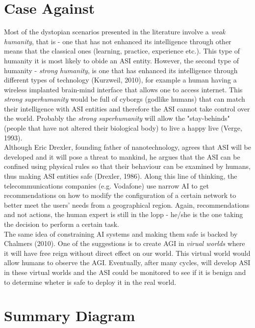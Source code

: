 \documentclass[11pt]{article}
\begin{document}
\section*{Case Against}
	Most of the dystopian scenarios presented in the literature involve a \textit{weak humanity}, that is - one that has not enhanced its intelligence through other means that the classical ones (learning, practice, experience etc.). This type of humanity it is most likely to obide an ASI entity. However, the second type of humanity - \textit{strong humanity}, is one that has enhanced its intelligence through different types of technology (Kurzweil, 2010), for example a human having a wireless implanted brain-mind interface that allows one to access internet. This \textit{strong superhumanity} would be full of cyborgs (godlike humans) that can match their intelligence with ASI entities and therefore the ASI cannot take control over the world. Probably the \textit{strong superhumanity} will allow the  "stay-behinds" (people that have not altered their biological body) to live a happy live (Verge, 1993). \\

	\indent
Although Eric Drexler, founding father of nanotechnology, agrees that ASI will be developed and it will pose a threat to mankind, he argues that the ASI can be confined using physical rules so that their behaviour can be examined by humans, thus making ASI entities safe (Drexler, 1986). Along this line of thinking, the telecommunications companies (e.g. Vodafone) use narrow AI to get recommendations on how to modify the configuration of a certain network to better meet the users' needs from a geographical region. Again, recommendations and not actions, the human expert is still in the lopp - he/she is the one taking the decision to perform a certain task.\\ 

	\indent
The same idea of constraining AI systems and making them safe is backed by Chalmers (2010). One of the suggestions is to create AGI in \textit{virual worlds} where it will have free reign without direct effect on our world. This virtual world would allow humans to observe the AGI. Eventually, after many cycles, will develop ASI in these virtual worlds and the ASI could be monitored to see if it is benign and to determine wheter is safe to deploy it in the real world.\\
  

\section*{Summary Diagram}
\end{document}
